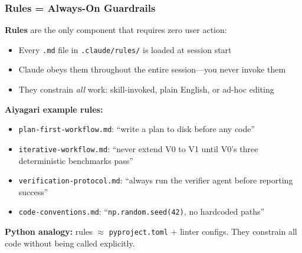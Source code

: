 \documentclass[10pt,english,aspectratio=169]{beamer}
\begin{document}
\begin{frame}
\frametitle{Rules = Always-On Guardrails}

\textbf{Rules} are the only component that requires zero user action:
\begin{itemize}
    \item Every \texttt{.md} file in \texttt{.claude/rules/} is loaded at session start
    \item Claude obeys them throughout the entire session---you never invoke them
    \item They constrain \textit{all} work: skill-invoked, plain English, or ad-hoc editing
\end{itemize}

\vspace{0.3cm}

\textbf{Aiyagari example rules:}
\begin{itemize}
    \item \texttt{plan-first-workflow.md}: ``write a plan to disk before any code''
    \item \texttt{iterative-workflow.md}: ``never extend V0 to V1 until V0's three deterministic benchmarks pass''
    \item \texttt{verification-protocol.md}: ``always run the verifier agent before reporting success''
    \item \texttt{code-conventions.md}: ``\texttt{np.random.seed(42)}, no hardcoded paths''
\end{itemize}

\vspace{0.2cm}

\textbf{Python analogy:} rules $\approx$ \texttt{pyproject.toml} + linter configs. They constrain all code without being called explicitly.
\end{frame}
\end{document}
